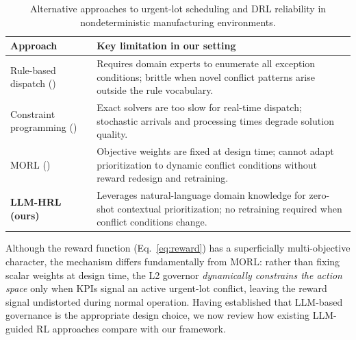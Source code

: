\documentclass[10pt]{article}
\begin{document}
\begin{table}[thb]
\centering
\caption{Alternative approaches to urgent-lot scheduling and DRL reliability
in nondeterministic manufacturing environments.}
\label{tab:alternatives}
\setlength{\tabcolsep}{4pt}
\footnotesize
\begin{tabularx}{\columnwidth}{@{}p{2.3cm}X@{}}
\hline
\textbf{Approach} & \textbf{Key limitation in our setting} \\ \hline
Rule-based dispatch (\citeyear{waschneck2018})
  & Requires domain experts to enumerate all exception conditions; brittle
    when novel conflict patterns arise outside the rule vocabulary. \\[2pt]
Constraint programming (\citeyear{baptiste2001})
  & Exact solvers are too slow for real-time dispatch; stochastic
    arrivals and processing times degrade solution quality. \\[2pt]
MORL (\citeyear{hayes2022})
  & Objective weights are fixed at design time; cannot adapt prioritization
    to dynamic conflict conditions without reward redesign and retraining. \\[2pt]
\textbf{LLM-HRL (ours)}
  & Leverages natural-language domain knowledge for zero-shot contextual
    prioritization; no retraining required when conflict conditions change. \\ \hline
\end{tabularx}
\normalsize
\end{table}

Although the reward function (Eq.~\ref{eq:reward}) has a superficially
multi-objective character, the mechanism differs fundamentally from MORL: rather
than fixing scalar weights at design time, the L2 governor \emph{dynamically
constrains the action space} only when KPIs signal an active urgent-lot conflict,
leaving the reward signal undistorted during normal operation.
Having established that LLM-based governance is the appropriate design choice,
we now review how existing LLM-guided RL approaches compare with our framework.
\end{document}
